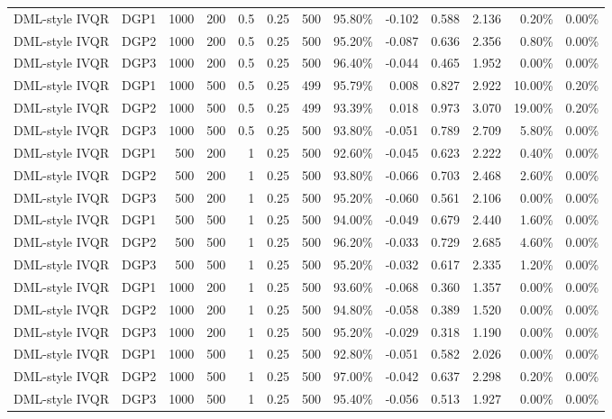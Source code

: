 \begin{landscape}
\begin{longtable}{llrrrrrrrrrrr}
DML-style IVQR & DGP1 & 1000 & 200 & 0.5 & 0.25 & 500 & 95.80\% & -0.102 & 0.588 & 2.136 & 0.20\% & 0.00\% \\
DML-style IVQR & DGP2 & 1000 & 200 & 0.5 & 0.25 & 500 & 95.20\% & -0.087 & 0.636 & 2.356 & 0.80\% & 0.00\% \\
DML-style IVQR & DGP3 & 1000 & 200 & 0.5 & 0.25 & 500 & 96.40\% & -0.044 & 0.465 & 1.952 & 0.00\% & 0.00\% \\
DML-style IVQR & DGP1 & 1000 & 500 & 0.5 & 0.25 & 499 & 95.79\% & 0.008 & 0.827 & 2.922 & 10.00\% & 0.20\% \\
DML-style IVQR & DGP2 & 1000 & 500 & 0.5 & 0.25 & 499 & 93.39\% & 0.018 & 0.973 & 3.070 & 19.00\% & 0.20\% \\
DML-style IVQR & DGP3 & 1000 & 500 & 0.5 & 0.25 & 500 & 93.80\% & -0.051 & 0.789 & 2.709 & 5.80\% & 0.00\% \\
DML-style IVQR & DGP1 & 500 & 200 & 1 & 0.25 & 500 & 92.60\% & -0.045 & 0.623 & 2.222 & 0.40\% & 0.00\% \\
DML-style IVQR & DGP2 & 500 & 200 & 1 & 0.25 & 500 & 93.80\% & -0.066 & 0.703 & 2.468 & 2.60\% & 0.00\% \\
DML-style IVQR & DGP3 & 500 & 200 & 1 & 0.25 & 500 & 95.20\% & -0.060 & 0.561 & 2.106 & 0.00\% & 0.00\% \\
DML-style IVQR & DGP1 & 500 & 500 & 1 & 0.25 & 500 & 94.00\% & -0.049 & 0.679 & 2.440 & 1.60\% & 0.00\% \\
DML-style IVQR & DGP2 & 500 & 500 & 1 & 0.25 & 500 & 96.20\% & -0.033 & 0.729 & 2.685 & 4.60\% & 0.00\% \\
DML-style IVQR & DGP3 & 500 & 500 & 1 & 0.25 & 500 & 95.20\% & -0.032 & 0.617 & 2.335 & 1.20\% & 0.00\% \\
DML-style IVQR & DGP1 & 1000 & 200 & 1 & 0.25 & 500 & 93.60\% & -0.068 & 0.360 & 1.357 & 0.00\% & 0.00\% \\
DML-style IVQR & DGP2 & 1000 & 200 & 1 & 0.25 & 500 & 94.80\% & -0.058 & 0.389 & 1.520 & 0.00\% & 0.00\% \\
DML-style IVQR & DGP3 & 1000 & 200 & 1 & 0.25 & 500 & 95.20\% & -0.029 & 0.318 & 1.190 & 0.00\% & 0.00\% \\
DML-style IVQR & DGP1 & 1000 & 500 & 1 & 0.25 & 500 & 92.80\% & -0.051 & 0.582 & 2.026 & 0.00\% & 0.00\% \\
DML-style IVQR & DGP2 & 1000 & 500 & 1 & 0.25 & 500 & 97.00\% & -0.042 & 0.637 & 2.298 & 0.20\% & 0.00\% \\
DML-style IVQR & DGP3 & 1000 & 500 & 1 & 0.25 & 500 & 95.40\% & -0.056 & 0.513 & 1.927 & 0.00\% & 0.00\% \\

\end{longtable}
\end{landscape}
